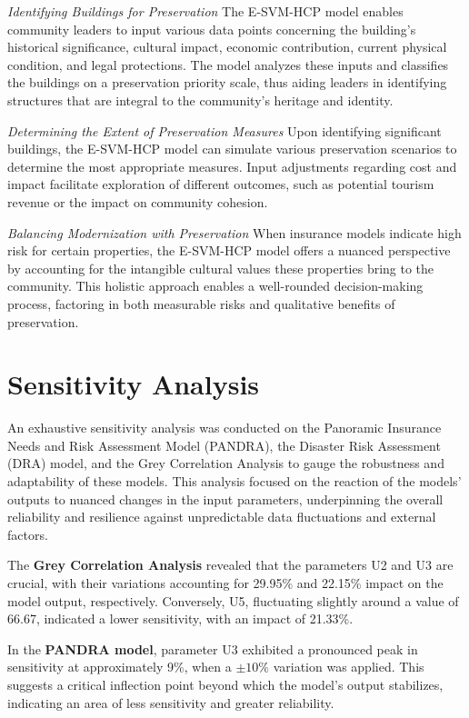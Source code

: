 \documentclass{mcmthesis}
\begin{document}
\textit{Identifying Buildings for Preservation}
The E-SVM-HCP model enables community leaders to input various data points concerning the building's historical significance, cultural impact, economic contribution, current physical condition, and legal protections. The model analyzes these inputs and classifies the buildings on a preservation priority scale, thus aiding leaders in identifying structures that are integral to the community's heritage and identity.

\textit{Determining the Extent of Preservation Measures}
Upon identifying significant buildings, the E-SVM-HCP model can simulate various preservation scenarios to determine the most appropriate measures. Input adjustments regarding cost and impact facilitate exploration of different outcomes, such as potential tourism revenue or the impact on community cohesion.

\textit{Balancing Modernization with Preservation}
When insurance models indicate high risk for certain properties, the E-SVM-HCP model offers a nuanced perspective by accounting for the intangible cultural values these properties bring to the community. This holistic approach enables a well-rounded decision-making process, factoring in both measurable risks and qualitative benefits of preservation.


\section{Sensitivity Analysis}


An exhaustive sensitivity analysis was conducted on the Panoramic Insurance Needs and Risk Assessment Model (PANDRA), the Disaster Risk Assessment (DRA) model, and the Grey Correlation Analysis to gauge the robustness and adaptability of these models. This analysis focused on the reaction of the models' outputs to nuanced changes in the input parameters, underpinning the overall reliability and resilience against unpredictable data fluctuations and external factors.

The \textbf{Grey Correlation Analysis} revealed that the parameters U2 and U3 are crucial, with their variations accounting for 29.95\% and 22.15\% impact on the model output, respectively. Conversely, U5, fluctuating slightly around a value of 66.67, indicated a lower sensitivity, with an impact of 21.33\%.

In the \textbf{PANDRA model}, parameter U3 exhibited a pronounced peak in sensitivity at approximately 9\%, when a \(\pm10\%\) variation was applied. This suggests a critical inflection point beyond which the model's output stabilizes, indicating an area of less sensitivity and greater reliability.
\end{document}
